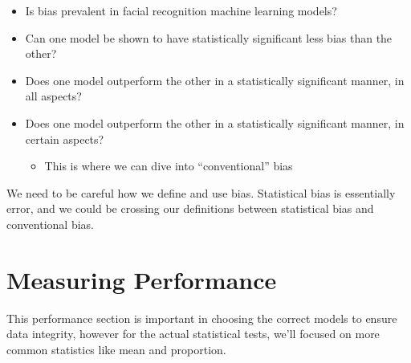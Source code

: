 \documentclass[
  letterpaper,
  DIV=11,
  numbers=noendperiod]{scrreprt}
\providecommand{\tightlist}{%
  \setlength{\itemsep}{0pt}\setlength{\parskip}{0pt}}\usepackage{longtable,booktabs,array}
\begin{document}
\begin{itemize}
\tightlist
\item
  Is bias prevalent in facial recognition machine learning models?
\item
  Can one model be shown to have statistically significant less bias
  than the other?
\item
  Does one model outperform the other in a statistically significant
  manner, in all aspects?
\item
  Does one model outperform the other in a statistically significant
  manner, in certain aspects?

  \begin{itemize}
  \tightlist
  \item
    This is where we can dive into ``conventional'' bias
  \end{itemize}
\end{itemize}

\begin{tcolorbox}[enhanced jigsaw, bottomrule=.15mm, left=2mm, bottomtitle=1mm, leftrule=.75mm, coltitle=black, toprule=.15mm, breakable, opacitybacktitle=0.6, titlerule=0mm, colback=white, colbacktitle=quarto-callout-note-color!10!white, toptitle=1mm, arc=.35mm, rightrule=.15mm, colframe=quarto-callout-note-color-frame, opacityback=0, title=\textcolor{quarto-callout-note-color}{\faInfo}\hspace{0.5em}{Thoughts on Bias}]

We need to be careful how we define and use bias. Statistical bias is
essentially error, and we could be crossing our definitions between
statistical bias and conventional bias.

\end{tcolorbox}

\hypertarget{measuring-performance}{%
\section{Measuring Performance}\label{measuring-performance}}

\begin{tcolorbox}[enhanced jigsaw, bottomrule=.15mm, left=2mm, bottomtitle=1mm, leftrule=.75mm, coltitle=black, toprule=.15mm, breakable, opacitybacktitle=0.6, titlerule=0mm, colback=white, colbacktitle=quarto-callout-note-color!10!white, toptitle=1mm, arc=.35mm, rightrule=.15mm, colframe=quarto-callout-note-color-frame, opacityback=0, title=\textcolor{quarto-callout-note-color}{\faInfo}\hspace{0.5em}{Note}]

This performance section is important in choosing the correct models to
ensure data integrity, however for the actual statistical tests, we'll
focused on more common statistics like mean and proportion.

\end{tcolorbox}
\end{document}
